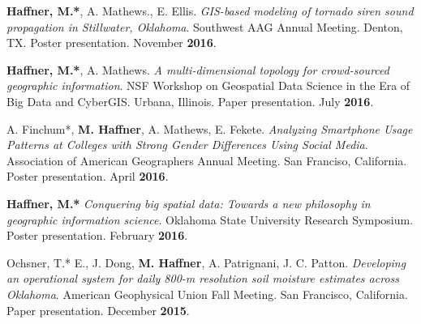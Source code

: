 \begin{cventries}
   \cventry
      {}
      {}
      {}
      {}
      {
        \begin{cvitems}
            \item {\textbf{Haffner, M.*}, A. Mathews., E. Ellis.
                \textit{GIS-based modeling of tornado siren sound propagation in
                  Stillwater, Oklahoma}. Southwest AAG Annual Meeting. Denton,
                TX. Poster  presentation. November \textbf{2016}.}
            \end{cvitems}
          }
   \cventry
      {}
      {}
      {}
      {}
      {
        \begin{cvitems}
        \item {\textbf{Haffner, M.*}, A. Mathews. \textit{A multi-dimensional topology for crowd-sourced geographic information}. NSF Workshop on Geospatial Data Science in the Era of Big Data and CyberGIS. Urbana, Illinois. Paper presentation. July \textbf{2016}.} 
          \end{cvitems}
              }
   \cventry
      {}
      {}
      {}
      {}
      {
        \begin{cvitems}
        \item A. Finchum*, {\textbf{M. Haffner}, A. Mathews, E. Fekete. \textit{Analyzing Smartphone Usage Patterns at Colleges with Strong Gender Differences Using Social Media}. Association of American Geographers Annual Meeting. San Franciso, California. Poster presentation. April \textbf{2016}.} 
            \end{cvitems}
            }
   \cventry
      {}
      {}
      {}
      {}
      {
        \begin{cvitems}
            \item {\textbf{Haffner, M.*} \textit{Conquering big spatial data: Towards a new philosophy in geographic information science}. Oklahoma State University Research Symposium. Poster presentation. February \textbf{2016}.}   
              \end{cvitems}
            }
   \cventry
      {}
      {}
      {}
      {}
      {
        \begin{cvitems}
            \item {Ochsner, T.* E., J. Dong, \textbf{M. Haffner}, A. Patrignani, J. C. Patton. \textit{Developing an operational system for daily 800-m resolution soil moisture estimates across Oklahoma}. American Geophysical Union Fall Meeting. San Francisco, California. Paper presentation. December \textbf{2015}.} 

\end{cvitems}}
\end{cventries}

